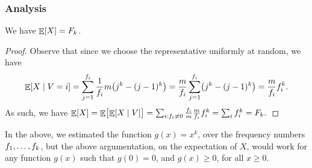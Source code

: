 
\subsubsection{Analysis}




\begin{lemma}
    We have $\mathop{\mathbb{E}}\!\left[ {X} \right]=F_k$.
\end{lemma}
\begin{proof}
    Observe that since we choose the representative uniformly at
    random, we have
    \begin{equation*}
        \ExCond{X}{V=i}
        =%
        \sum_{j=1}^{\frq_i}\frac{1}{\frq_i} m \bigl( j^k - (j-1)^k \bigr)
        =%
        \frac{m}{\frq_i}\sum_{j=1}^{\frq_i}
        \bigl( j^k - (j-1)^k \bigr)
        =%
        \frac{m}{\frq_i} \frq_i^{k}.
    \end{equation*}
    As such, we have
    \begin{math}
        \Ex{X}%
        =%
        \Ex{\bigl.\ExCond{X}{V}} %
        =%
        \sum_{i: \frq_i\neq 0} \frac{\frq_i}{m} \frac{m}{\frq_i}
        \frq_i^{k} %
        =%
        \sum_{i} \frq_i^{k} %
        =%
        \Frq_k.
    \end{math}
\end{proof}



\begin{remark}
    In the above, we estimated the function $g(x)=x^k$, over the
    frequency numbers $f_1, \ldots, f_k$, but the above
    argumentation, on the expectation of $X$, would work for any
    function $g(x)$ such that $g(0)=0$, and $g(x) \geq 0$, for all
    $x \geq 0$.
\end{remark}


